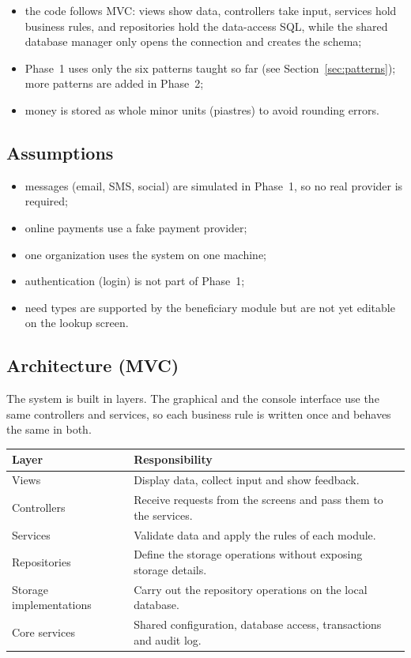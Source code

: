 \begin{itemize}
  \item the code follows MVC: views show data, controllers take input, services hold business rules, and repositories hold the data-access SQL, while the shared database manager only opens the connection and creates the schema;
  \item Phase~1 uses only the six patterns taught so far (see Section~\ref{sec:patterns}); more patterns are added in Phase~2;
  \item money is stored as whole minor units (piastres) to avoid rounding errors.
\end{itemize}

\subsection{Assumptions}

\begin{itemize}
  \item messages (email, SMS, social) are simulated in Phase~1, so no real provider is required;
  \item online payments use a fake payment provider;
  \item one organization uses the system on one machine;
  \item authentication (login) is not part of Phase~1;
  \item need types are supported by the beneficiary module but are not yet editable on the lookup screen.
\end{itemize}

\subsection{Architecture (MVC)}

The system is built in layers. The graphical and the console interface use the same controllers and services, so each business rule is written once and behaves the same in both.

\begin{center}
\small
\begin{tabularx}{\textwidth}{@{}L{0.27\textwidth}Y@{}}
\toprule
\textbf{Layer} & \textbf{Responsibility} \\
\midrule
Views & Display data, collect input and show feedback. \\
Controllers & Receive requests from the screens and pass them to the services. \\
Services & Validate data and apply the rules of each module. \\
Repositories & Define the storage operations without exposing storage details. \\
Storage implementations & Carry out the repository operations on the local database. \\
Core services & Shared configuration, database access, transactions and audit log. \\
\bottomrule
\end{tabularx}
\end{center}


